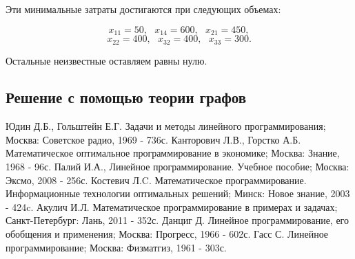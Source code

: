 \documentclass[a4paper,12pt]{article}
\begin{document}
	Эти минимальные затраты достигаются при следующих объемах:
	
	\[
		x_{11} = 50, \ \ \ x_{14} = 600, \ \ \ x_{21} = 450,
	\]
	\[
		x_{22} = 400, \ \ \ x_{32} = 400, \ \ \ x_{33} = 300.
	\]
	
	Остальные неизвестные оставляем равны нулю.
	\clearpage

	\subsection{Решение с помощью теории графов}

	\clearpage

\begin{thebibliography}{99}
	Юдин Д.Б., Гольштейн Е.Г. Задачи и методы линейного программирования;
	Москва: Советское радио, 1969 - 736с.
	Канторович Л.В., Горстко А.Б. Математическое оптимальное программирование  в экономике;
	Москва: Знание, 1968 - 96с.
	Палий И.А., Линейное программирование. Учебное пособие;
	Москва: Эксмо, 2008 - 256с.
	Костевич Л.C. Математическое программирование. Информационные технологии оптимальных решений;
	Минск: Новое знание, 2003 - 424c.
	Акулич И.Л. Математическое программирование в примерах и задачах; Санкт-Петербург: Лань, 2011 - 352с.
	Данциг Д. Линейное программирование, его обобщения и применения; Москва: Прогресс, 1966 - 602с.
	Гасс С. Линейное программирование; Москва: Физматгиз, 1961 - 303с.
\end{thebibliography}
\end{document}
